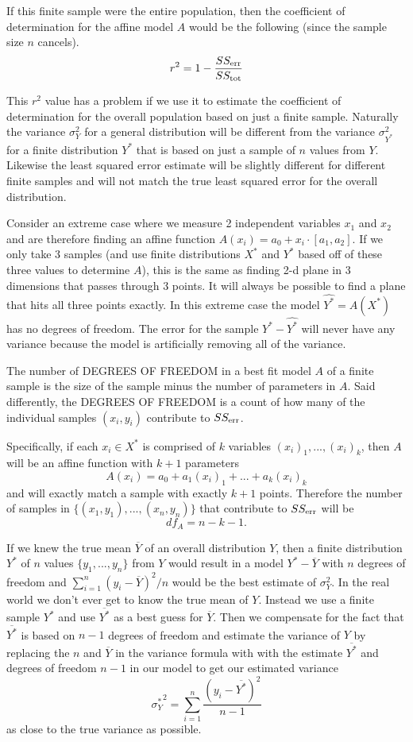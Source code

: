 If this finite sample were the entire population, then the coefficient of determination for the affine model $A$ would be the following (since the sample size $n$ cancels).
$$r^2=1-\frac{SS_{\text{err}}}{SS_{\text{tot}}}$$

This $r^2$ value has a problem if we use it to estimate the coefficient of determination for the overall population based on just a finite sample. Naturally the variance $\sigma_Y^2$ for a general distribution will be different from the variance $\sigma_{Y^*}^2$ for a finite distribution $Y^*$ that is based on just a sample of $n$ values from $Y$. Likewise the least squared error estimate will be slightly different for different finite samples and will not match the true least squared error for the overall distribution.

Consider an extreme case where we measure 2 independent variables $x_1$ and $x_2$ and are therefore finding an affine function $A(x_i)=a_0+x_i\cdot[a_1,a_2]$. If we only take 3 samples (and use finite distributions $X^*$ and $Y^*$ based off of these three values to determine $A$), this is the same as finding 2-d plane in 3 dimensions that passes through 3 points. It will always be possible to find a plane that hits all three points exactly. In this extreme case the model $\widehat{Y^*}=A(X^*)$ has no degrees of freedom. The error for the sample $Y^*-\widehat{Y^*}$ will never have any variance because the model is artificially removing all of the variance.

\begin{definition}
The number of DEGREES OF FREEDOM in a best fit model $A$ of a finite sample is the size of the sample minus the number of parameters in $A$. Said differently, the DEGREES OF FREEDOM is a count of how many of the individual samples $(x_i,y_i)$ contribute to $SS_{\text{err}}$.

Specifically, if each $x_i\in X^*$ is comprised of $k$ variables $(x_i)_1,...,(x_i)_k$, then $A$ will be an affine function with $k+1$ parameters
$$A(x_i)=a_0+a_1(x_i)_1+...+a_k(x_i)_k$$
and will exactly match a sample with exactly $k+1$ points. Therefore the number of samples in $\{(x_1,y_1),...,(x_n,y_n)\}$ that contribute to $SS_{\text{err}}$ will be
$$df_A=n-k-1.$$
\end{definition}

If we knew the true mean $\overline{Y}$ of an overall distribution $Y$, then a finite distribution $Y^*$ of $n$ values $\{y_1,...,y_n\}$ from $Y$ would result in a model $Y^*-\overline{Y}$ with $n$ degrees of freedom and $\sum_{i=1}^n(y_i-\overline{Y})^2/n$ would be the best estimate of $\sigma_Y^2$. In the real world we don't ever get to know the true mean of $Y$. Instead we use a finite sample $Y^*$ and use $\overline{Y^*}$ as a best guess for $\overline{Y}$. Then we compensate for the fact that $\overline{Y^*}$ is based on $n-1$ degrees of freedom and estimate the variance of $Y$ by replacing the $n$ and $\overline{Y}$ in the variance formula with with the estimate $\overline{Y^*}$ and degrees of freedom $n-1$ in our model to get our estimated variance
$${\sigma^*_Y}^2=\sum_{i=1}^n\frac{(y_i-\overline{Y^*})^2}{n-1}$$
as close to the true variance as possible.

